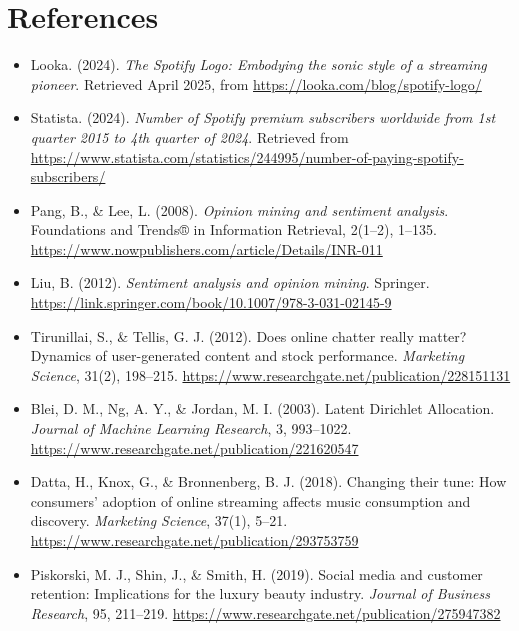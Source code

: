 \documentclass[
  11pt,
]{article}
\begin{document}
\hypertarget{references}{%
\section{References}\label{references}}

\begin{itemize}
\item
  Looka. (2024). \emph{The Spotify Logo: Embodying the sonic style of a
  streaming pioneer}. Retrieved April 2025, from
  \url{https://looka.com/blog/spotify-logo/}
\item
  Statista. (2024). \emph{Number of Spotify premium subscribers
  worldwide from 1st quarter 2015 to 4th quarter of 2024}. Retrieved
  from
  \url{https://www.statista.com/statistics/244995/number-of-paying-spotify-subscribers/}
\item
  Pang, B., \& Lee, L. (2008). \emph{Opinion mining and sentiment
  analysis}. Foundations and Trends® in Information Retrieval, 2(1--2),
  1--135. \url{https://www.nowpublishers.com/article/Details/INR-011}
\item
  Liu, B. (2012). \emph{Sentiment analysis and opinion mining}.
  Springer.
  \url{https://link.springer.com/book/10.1007/978-3-031-02145-9}
\item
  Tirunillai, S., \& Tellis, G. J. (2012). Does online chatter really
  matter? Dynamics of user-generated content and stock performance.
  \emph{Marketing Science}, 31(2), 198--215.
  \href{https://www.researchgate.net/publication/228151131_Does_Online_Chatter_Really_Matter_Dynamics_of_User-Generated_Content_and_Stock_Performance}{https://www.researchgate.net/publication/228151131}
\item
  Blei, D. M., Ng, A. Y., \& Jordan, M. I. (2003). Latent Dirichlet
  Allocation. \emph{Journal of Machine Learning Research}, 3, 993--1022.
  \href{https://www.researchgate.net/publication/221620547_Latent_Dirichlet_Allocation}{https://www.researchgate.net/publication/221620547}
\item
  Datta, H., Knox, G., \& Bronnenberg, B. J. (2018). Changing their
  tune: How consumers' adoption of online streaming affects music
  consumption and discovery. \emph{Marketing Science}, 37(1), 5--21.
  \href{https://www.researchgate.net/publication/293753759_Changing_Their_Tune_How_Consumers\%27_Adoption_of_Online_Streaming_Affects_Music_Consumption_and_Discovery}{https://www.researchgate.net/publication/293753759}
\item
  Piskorski, M. J., Shin, J., \& Smith, H. (2019). Social media and
  customer retention: Implications for the luxury beauty industry.
  \emph{Journal of Business Research}, 95, 211--219.
  \href{https://www.researchgate.net/publication/275947382_Social_Media_and_Customer_Retention_Implications_for_the_Luxury_Beauty_Industry}{https://www.researchgate.net/publication/275947382}
\end{itemize}
\end{document}
